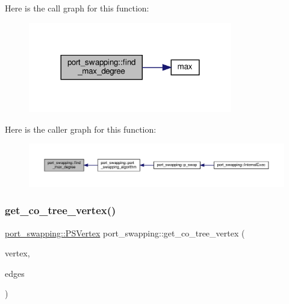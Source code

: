 Here is the call graph for this function\+:
\nopagebreak
\begin{figure}[H]
\begin{center}
\leavevmode
\includegraphics[width=252pt]{d6/d83/classport__swapping_a6f8dd7bd988dfeb3d4e220cff3014c11_cgraph}
\end{center}
\end{figure}
Here is the caller graph for this function\+:
\nopagebreak
\begin{figure}[H]
\begin{center}
\leavevmode
\includegraphics[width=350pt]{d6/d83/classport__swapping_a6f8dd7bd988dfeb3d4e220cff3014c11_icgraph}
\end{center}
\end{figure}
\mbox{\label{classport__swapping_a1d2a299635e0639fe2d892147940dcbf}} 
\subsubsection{\texorpdfstring{get\+\_\+co\+\_\+tree\+\_\+vertex()}{get\_co\_tree\_vertex()}}
{\footnotesize\ttfamily \hyperlink{classport__swapping_a9588366dd46f9f32aab2c8de93d5679f}{port\+\_\+swapping\+::\+P\+S\+Vertex} port\+\_\+swapping\+::get\+\_\+co\+\_\+tree\+\_\+vertex (\begin{DoxyParamCaption}\item[{\hyperlink{classport__swapping_a9588366dd46f9f32aab2c8de93d5679f}{P\+S\+Vertex}}]{vertex,  }\item[{std\+::vector$<$ \hyperlink{classport__swapping_ac98b23b7c2dd3f3792327fb666489d66}{P\+SE} $>$ \&}]{edges }\end{DoxyParamCaption})}



